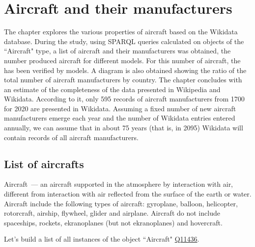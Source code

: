 \setchapterpreamble[u]{\margintoc}
\chapter{Aircraft and their manufacturers\protect\footnotemark}


The chapter explores the various properties of aircraft based on the Wikidata database.
During the study, using SPARQL queries calculated on objects of the ``Aircraft" type, a list of aircraft and their manufacturers was obtained, the number 
produced aircraft for different models. For this number of aircraft, the  has been verified by models.
A diagram is also obtained showing the ratio of the total number of aircraft manufacturers by country.
The chapter concludes with an estimate of the completeness of the data presented in Wikipedia and Wikidata. 
According to it, only 595 records of aircraft manufacturers from \num{1700} for 2020 are presented in Wikidata.
Assuming a fixed number of new aircraft manufacturers emerge each year and the number of Wikidata entries entered annually, 
we can assume that in about 75 years (that is, in 2095) Wikidata will contain records of all aircraft manufacturers.



\section{List of aircrafts}

Aircraft~--- an aircraft supported in the atmosphere by interaction with air, different from interaction with air reflected from the 
surface of the earth or water.
Aircraft include the following types of aircraft: gyroplane, balloon, helicopter, rotorcraft, airship, flywheel, glider and airplane.
Aircraft do not include spaceships, rockets, ekranoplanes (but not ekranoplanes) and hovercraft.

Let's build a list of all instances of the object ``Aircraft" \href{https://www.wikidata.org/wiki/Q11436}{Q11436}.

